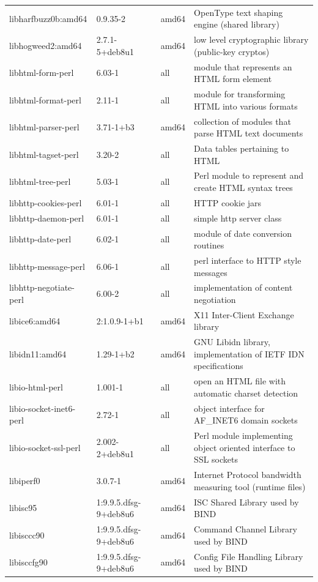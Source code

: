 \documentclass[a4paper,10pt]{article}
\begin{document}
\begin{appendices}
{\begin{longtable}{p{3.25cm}@{\hspace{0.25cm}}p{4cm}@{\hspace{0.25cm}}l@{\hspace{0.25cm}}p{7cm}}
libharfbuzz0b:amd64	&	0.9.35-2	&	amd64	&	OpenType text shaping engine (shared library)	\\
libhogweed2:amd64	&	2.7.1-5+deb8u1	&	amd64	&	low level cryptographic library (public-key cryptos)	\\
libhtml-form-perl	&	6.03-1	&	all	&	module that represents an HTML form element	\\
libhtml-format-perl	&	2.11-1	&	all	&	module for transforming HTML into various formats	\\
libhtml-parser-perl	&	3.71-1+b3	&	amd64	&	collection of modules that parse HTML text documents	\\
libhtml-tagset-perl	&	3.20-2	&	all	&	Data tables pertaining to HTML	\\
libhtml-tree-perl	&	5.03-1	&	all	&	Perl module to represent and create HTML syntax trees	\\
libhttp-cookies-perl	&	6.01-1	&	all	&	HTTP cookie jars	\\
libhttp-daemon-perl	&	6.01-1	&	all	&	simple http server class	\\
libhttp-date-perl	&	6.02-1	&	all	&	module of date conversion routines	\\
libhttp-message-perl	&	6.06-1	&	all	&	perl interface to HTTP style messages	\\
libhttp-negotiate-perl	&	6.00-2	&	all	&	implementation of content negotiation	\\
libice6:amd64	&	2:1.0.9-1+b1	&	amd64	&	X11 Inter-Client Exchange library	\\
libidn11:amd64	&	1.29-1+b2	&	amd64	&	GNU Libidn library, implementation of IETF IDN specifications	\\
libio-html-perl	&	1.001-1	&	all	&	open an HTML file with automatic charset detection	\\
libio-socket-inet6-perl	&	2.72-1	&	all	&	object interface for AF\_INET6 domain sockets	\\
libio-socket-ssl-perl	&	2.002-2+deb8u1	&	all	&	Perl module implementing object oriented interface to SSL sockets	\\
libiperf0	&	3.0.7-1	&	amd64	&	Internet Protocol bandwidth measuring tool (runtime files)	\\
libisc95	&	1:9.9.5.dfsg-9+deb8u6	&	amd64	&	ISC Shared Library used by BIND	\\
libisccc90	&	1:9.9.5.dfsg-9+deb8u6	&	amd64	&	Command Channel Library used by BIND	\\
libisccfg90	&	1:9.9.5.dfsg-9+deb8u6	&	amd64	&	Config File Handling Library used by BIND	\\

\end{longtable}}
\end{appendices}
\end{document}
